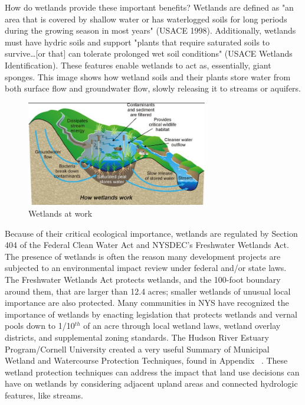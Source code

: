 How do wetlands provide these important benefits? Wetlands are defined as "an 
area that is covered by shallow water or has waterlogged soils for long periods 
during the growing season in most years" (USACE 1998). Additionally, wetlands 
must have hydric soils and support "plants that require saturated soils to 
survive\ldots [or that] can tolerate prolonged wet soil conditions" (USACE 
Wetlands Identification). These features enable wetlands to act as, 
essentially, giant sponges. This image shows how wetland soils and their plants 
store water from both surface flow and groundwater flow, slowly releasing it to 
streams or aquifers.
\begin{figure}
    \includegraphics[width=7.9cm, keepaspectratio]{images/wetlands_work.jpg}
  \caption{Wetlands at work}\label{fig:wetlands}
  \vspace{-10pt}
\end{figure}
Because of their critical ecological importance, wetlands are regulated by 
Section 404 of the Federal Clean Water Act and NYSDEC's Freshwater Wetlands 
Act. The presence of wetlands is often the reason many development projects are 
subjected to an environmental impact review under federal and/or state laws. The 
Freshwater Wetlands Act protects wetlands, and the 100-foot boundary around 
them, that are larger than 12.4 acres; smaller wetlands of unusual local 
importance are also protected. Many communities in NYS have recognized the 
importance of wetlands by enacting legislation that protects wetlands and vernal 
pools down to 1/10$^{th}$ of an acre through local wetland laws, wetland overlay 
districts, and supplemental zoning standards. The Hudson River Estuary 
Program/Cornell University created a very useful Summary of Municipal Wetland 
and Watercourse Protection Techniques, found in Appendix 
~. These wetland protection techniques can address the 
impact that land use decisions can have on wetlands by considering adjacent 
upland areas and connected hydrologic features, like streams.

